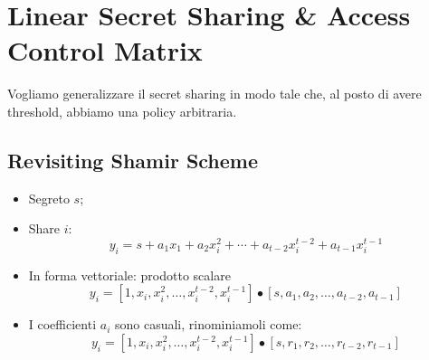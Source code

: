 \documentclass{book}
\begin{document}
\chapter{Linear Secret Sharing \& Access Control Matrix}
Vogliamo generalizzare il secret sharing in modo tale che, al posto di avere threshold, abbiamo una policy arbitraria.
\section{Revisiting Shamir Scheme}
\begin{itemize}
	\item Segreto \(s\);
	\item Share \(i\): \begin{equation*}
		      y_{i}=s+a_{1}x_{1}+a_{2}x_{i}^{2}+\cdots +a_{t-2}x_{i}^{t-2}+a_{t-1}x_{i}^{t-1}
	      \end{equation*}
	\item In forma vettoriale: prodotto scalare\begin{equation*}
		      y_{i}=[1,x_{i},x_{i}^2,\ldots ,x_{i}^{t-2},x_{i}^{t-1}]\bullet [s,a_{1},a_{2},\ldots ,a_{t-2},a_{t-1}]
	      \end{equation*}
	\item I coefficienti \(a_{{i}}\) sono casuali, rinominiamoli come:\begin{equation*}
		      y_{i}=[1,x_{i},x_{i}^2,\ldots ,x_{i}^{t-2},x_{i}^{t-1}]\bullet [s,r_{1},r_{2},\ldots ,r_{t-2},r_{t-1}]
	      \end{equation*}
\end{itemize}
\end{document}
